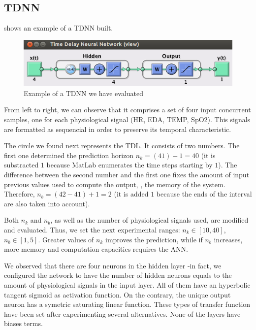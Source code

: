 \subsection{TDNN}
\label{subsec:tdnnapplication}

 shows an example of a TDNN built.
\begin{figure}[!ht]
\centering
\includegraphics[width=0.9\columnwidth]{images/results/tdnn}
\caption{Example of a TDNN we have evaluated}
\label{fig:tdnnbuilt}
\end{figure}

From left to right, we can observe that it comprises a set of four input concurrent samples, 
one for each physiological signal (HR, EDA, TEMP, SpO2). This signals are formatted as sequencial in order to preserve its temporal characteristic.

The circle we found next represents the TDL. It consists of two numbers. The first one determined the prediction horizon $n_{k}=(41)-1=40$ (it is substracted $1$ because MatLab enumerates the time steps starting by $1$). The difference between the second number and the first one fixes the amount of input previous values used to compute the output, \ie, the memory of the system. Therefore, $n_{b}=(42-41)+1=2$ (it is added $1$ because the ends of the interval are also taken into account).

Both $n_{k}$ and $n_{b}$, as well as the number of physiological signals used, are modified and evaluated. Thus, we set the next experimental ranges: $n_{k}\in [10,40]$, $n_{b}\in [1,5]$. Greater values of $n_{k}$ improves the prediction, while if $n_{b}$ increases, more memory and computation capacities requires the ANN.

We observed that there are four neurons in the hidden layer -in fact, we configured the network to have the number of hidden neurons equals to the amount of physiological signals in the input layer. All of them have an hyperbolic tangent sigmoid as activation function. On the contrary, the unique output neuron has a symetric saturating linear function. These types of transfer function have been set after experimenting several alternatives. None of the layers have biases terms.

